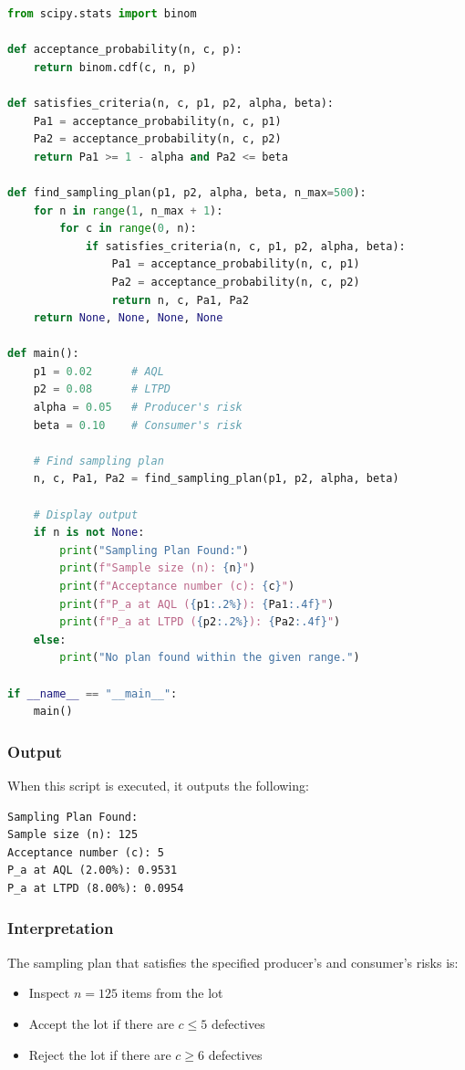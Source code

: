 \documentclass[twoside]{book}
\begin{document}
\begin{lstlisting}[language=Python]
from scipy.stats import binom

def acceptance_probability(n, c, p):
    return binom.cdf(c, n, p)

def satisfies_criteria(n, c, p1, p2, alpha, beta):
    Pa1 = acceptance_probability(n, c, p1)
    Pa2 = acceptance_probability(n, c, p2)
    return Pa1 >= 1 - alpha and Pa2 <= beta

def find_sampling_plan(p1, p2, alpha, beta, n_max=500):
    for n in range(1, n_max + 1):
        for c in range(0, n):
            if satisfies_criteria(n, c, p1, p2, alpha, beta):
                Pa1 = acceptance_probability(n, c, p1)
                Pa2 = acceptance_probability(n, c, p2)
                return n, c, Pa1, Pa2
    return None, None, None, None

def main():
    p1 = 0.02      # AQL
    p2 = 0.08      # LTPD
    alpha = 0.05   # Producer's risk
    beta = 0.10    # Consumer's risk

    # Find sampling plan
    n, c, Pa1, Pa2 = find_sampling_plan(p1, p2, alpha, beta)

    # Display output
    if n is not None:
        print("Sampling Plan Found:")
        print(f"Sample size (n): {n}")
        print(f"Acceptance number (c): {c}")
        print(f"P_a at AQL ({p1:.2%}): {Pa1:.4f}")
        print(f"P_a at LTPD ({p2:.2%}): {Pa2:.4f}")
    else:
        print("No plan found within the given range.")

if __name__ == "__main__":
    main()
\end{lstlisting}

\subsubsection*{Output}
When this script is executed, it outputs the following:

\begin{lstlisting}
Sampling Plan Found:
Sample size (n): 125
Acceptance number (c): 5
P_a at AQL (2.00%): 0.9531
P_a at LTPD (8.00%): 0.0954
\end{lstlisting}

\subsubsection*{Interpretation}
The sampling plan that satisfies the specified producer's and consumer's risks is:
\begin{itemize}
    \item Inspect $n = 125$ items from the lot
    \item Accept the lot if there are $c \leq 5$ defectives
    \item Reject the lot if there are $c \geq 6$ defectives
\end{itemize}
\end{document}
